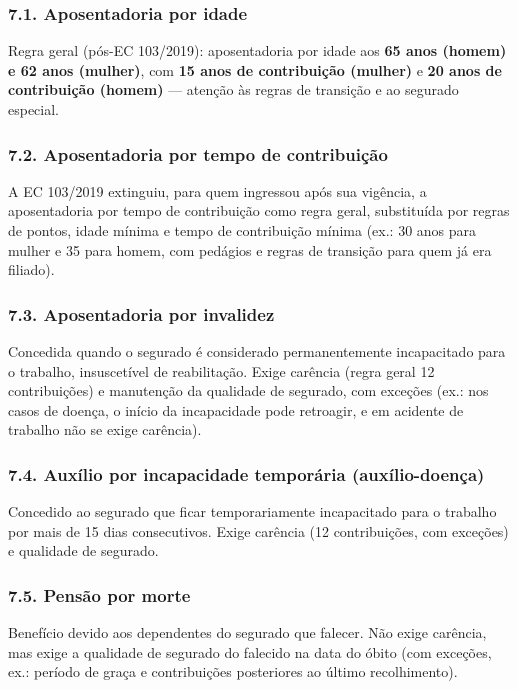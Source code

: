 \documentclass[11pt,a4paper]{article}
\begin{document}
\subsubsection*{7.1. Aposentadoria por idade}

Regra geral (pós-EC 103/2019): aposentadoria por idade aos \textbf{65 anos (homem) e 62 anos (mulher)}, com \textbf{15 anos de contribuição (mulher)} e \textbf{20 anos de contribuição (homem)} — atenção às regras de transição e ao segurado especial.

\subsubsection*{7.2. Aposentadoria por tempo de contribuição}

A EC 103/2019 extinguiu, para quem ingressou após sua vigência, a aposentadoria por tempo de contribuição como regra geral, substituída por regras de pontos, idade mínima e tempo de contribuição mínima (ex.: 30 anos para mulher e 35 para homem, com pedágios e regras de transição para quem já era filiado).

\subsubsection*{7.3. Aposentadoria por invalidez}

Concedida quando o segurado é considerado permanentemente incapacitado para o trabalho, insuscetível de reabilitação. Exige carência (regra geral 12 contribuições) e manutenção da qualidade de segurado, com exceções (ex.: nos casos de doença, o início da incapacidade pode retroagir, e em acidente de trabalho não se exige carência).

\subsubsection*{7.4. Auxílio por incapacidade temporária (auxílio-doença)}

Concedido ao segurado que ficar temporariamente incapacitado para o trabalho por mais de 15 dias consecutivos. Exige carência (12 contribuições, com exceções) e qualidade de segurado.

\subsubsection*{7.5. Pensão por morte}

Benefício devido aos dependentes do segurado que falecer. Não exige carência, mas exige a qualidade de segurado do falecido na data do óbito (com exceções, ex.: período de graça e contribuições posteriores ao último recolhimento).
\end{document}
